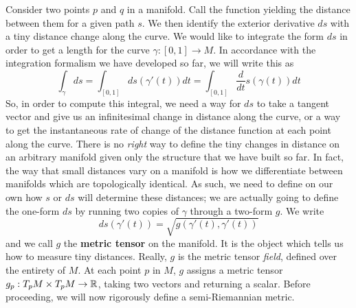 Consider two points $p$ and $q$ in a manifold.  Call the function yielding the distance between them for a given path $s$.  We then identify the exterior derivative $ds$ with a tiny distance change along the curve.  We would like to integrate the form $ds$ in order to get a length for the curve $\gamma: [0, 1] \to M$.  In  accordance with the integration formalism we have developed so far, we will write this as 
\begin{equation*}
	\int_\gamma ds = \int_{[0, 1]} ds(\gamma'(t)) dt = \int_{[0, 1]}\frac{d}{dt}s(\gamma(t)) dt
\end{equation*}
So, in order to compute this integral, we need a way for $ds$ to take a tangent vector and give us an infinitesimal change in distance along the curve, or a way to get the instantaneous rate of change of the distance function at each point along the curve.  There is no \textit{right} way to define the tiny changes in distance on an arbitrary manifold given only the structure that we have built so far.  In fact, the way that small distances vary on a manifold is how we differentiate between manifolds which are topologically identical.  As such, we need to define on our own how $s$ or $ds$ will determine these distances; we are actually going to define the one-form $ds$ by running two copies of $\gamma$ through a two-form $g$.  We write
\begin{equation*}
	ds(\gamma'(t)) = \sqrt{g(\gamma'(t), \gamma'(t)) }
\end{equation*}
and we call $g$ the \textbf{metric tensor} on the manifold.  It is the object which tells us how to measure tiny distances.  Really, $g$ is the metric tensor \textit{field}, defined over the entirety of $M$.  At each point $p$ in $M$, $g$ assigns a metric tensor $g_p: T_pM \times T_pM \to \mathbb{R}$, taking two vectors and returning a scalar.  Before proceeding, we will now rigorously define a semi-Riemannian metric.\\

